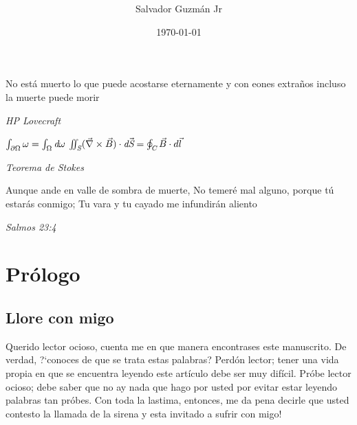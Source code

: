 \documentclass{article}
\begin{document}
	\title{
		\Large{
		}
	}
	
	\author{Salvador Guzm\'{a}n Jr}
	\date{\today}
	\maketitle
	
	\pagebreak
	\begin{center}
		\thispagestyle{empty}
		\vspace*{\fill}
					\textbf{
		}
		
		\vspace*{\fill}
	\end{center}
	\pagebreak
	\begin{center}
		\epigraph{
			No est\'{a} muerto lo que puede acostarse eternamente
			y con eones extraños  incluso la muerte
			puede morir
		}{\textit{
			HP Lovecraft
		}}
		\epigraph{
			\begin{math}
				\int_{\partial\Omega} \omega=\int_{\Omega} \emph{d}\omega
			\end{math}
			\linebreak
			\linebreak
			\begin{math}
				\iint_{\emph{S}}(\vec{\nabla}\times\vec{B})\cdot \emph{d}\vec{\emph{S}}=\oint_{\emph{C}}\vec{B}\cdot d \vec{l}
			\end{math}
		}{
			\textit{Teorema de Stokes}
		}

		\epigraph{
			Aunque ande en valle de sombra de muerte,
			No temeré mal alguno, porque tú estarás conmigo;
			Tu vara y tu cayado me infundirán aliento
		}{
			\textit{Salmos 23:4}
		}
	\end{center}
	\pagebreak
	\tableofcontents
	\pagebreak
	
	\section{Prólogo}
	\subsection{Llore con migo}
	Querido lector ocioso, cuenta me en que manera encontrases este manuscrito. De verdad, \mbox{?`}conoces de que se trata estas palabras? Perdón lector; tener una vida propia en que se encuentra leyendo este art\'{i}culo debe ser muy difícil. Pr\'{o}be lector ocioso; debe saber que no ay nada que hago por usted por evitar estar leyendo palabras tan pr\'{o}bes. Con toda la lastima, entonces, me da pena decirle que usted contesto la llamada de la sirena y esta invitado a sufrir con migo!
	
\end{document}
